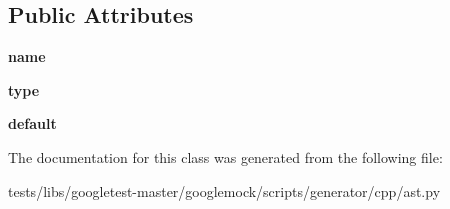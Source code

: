 \subsection*{Public Attributes}
\begin{DoxyCompactItemize}
\item 
\mbox{\label{classtests_1_1libs_1_1googletest-master_1_1googlemock_1_1scripts_1_1generator_1_1cpp_1_1ast_1_1Parameter_ac73f6319ad2bb660cc1c9f95c4c0bfda}} 
{\bfseries name}
\item 
\mbox{\label{classtests_1_1libs_1_1googletest-master_1_1googlemock_1_1scripts_1_1generator_1_1cpp_1_1ast_1_1Parameter_a8f73b07a90763e5bed79c4798680ac56}} 
{\bfseries type}
\item 
\mbox{\label{classtests_1_1libs_1_1googletest-master_1_1googlemock_1_1scripts_1_1generator_1_1cpp_1_1ast_1_1Parameter_ac2ccb1c49866d2678b4f0989198228d0}} 
{\bfseries default}
\end{DoxyCompactItemize}


The documentation for this class was generated from the following file\+:\begin{DoxyCompactItemize}
\item 
tests/libs/googletest-\/master/googlemock/scripts/generator/cpp/ast.\+py\end{DoxyCompactItemize}
